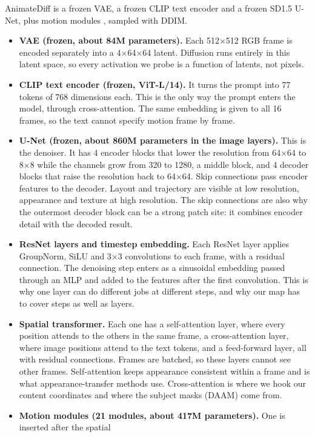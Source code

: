 \documentclass[twoside,english]{article}
\begin{document}
AnimateDiff is a frozen VAE, a frozen CLIP text encoder and a frozen SD1.5 U-Net, plus motion modules
\citep{hf_animatediff}, sampled with DDIM.
\begin{itemize}
\item \textbf{VAE (frozen, about 84M parameters).} Each 512$\times$512 RGB frame is encoded separately
  into a 4$\times$64$\times$64 latent. Diffusion runs entirely in this latent space, so every activation
  we probe is a function of latents, not pixels.
\item \textbf{CLIP text encoder (frozen, ViT-L/14).} It turns the prompt into 77 tokens of 768
  dimensions each. This is the only way the prompt enters the model, through cross-attention. The same
  embedding is given to all 16 frames, so the text cannot specify motion frame by frame.
\item \textbf{U-Net (frozen, about 860M parameters in the image layers).} This is the denoiser. It has
  4 encoder blocks that lower the resolution from 64$\times$64 to 8$\times$8 while the channels grow from
  320 to 1280, a middle block, and 4 decoder blocks that raise the resolution back to 64$\times$64. Skip
  connections pass encoder features to the decoder. Layout and trajectory are visible at low
  resolution, appearance and texture at high resolution. The skip connections are also why the
  outermost decoder block can be a strong patch site: it combines encoder detail with the decoded result.
\item \textbf{ResNet layers and timestep embedding.} Each ResNet layer applies GroupNorm, SiLU and
  3$\times$3 convolutions to each frame, with a residual connection. The denoising step enters as a
  sinusoidal embedding passed through an MLP and added to the features after the first convolution.
  This is why one layer can do different jobs at different steps, and why our map has to cover steps
  as well as layers.
\item \textbf{Spatial transformer.} Each one has a self-attention layer, where every position attends
  to the others in the same frame, a cross-attention layer, where image positions attend to the text
  tokens, and a feed-forward layer, all with residual connections. Frames are batched, so these layers
  cannot see other frames. Self-attention keeps appearance consistent within a frame and is what
  appearance-transfer methods use. Cross-attention is where we hook our content coordinates and where
  the subject masks (DAAM) come from.
\item \textbf{Motion modules (21 modules, about 417M parameters).} One is inserted after the spatial

\end{itemize}
\end{document}
